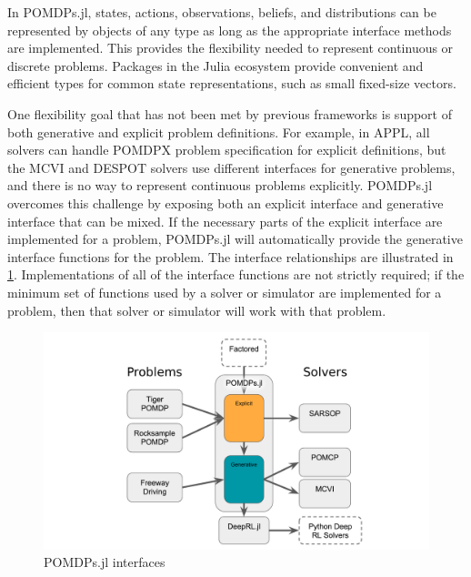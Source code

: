 In POMDPs.jl, states, actions, observations, beliefs, and distributions can be represented by objects of any type as long as the appropriate interface methods are implemented.
This provides the flexibility needed to represent continuous or discrete problems.
Packages in the Julia ecosystem provide convenient and efficient types for common state representations, such as small fixed-size vectors.

One flexibility goal that has not been met by previous frameworks is support of both generative and explicit problem definitions.
For example, in APPL, all solvers can handle POMDPX problem specification for explicit definitions, but the MCVI and DESPOT solvers use different interfaces for generative problems, and there is no way to represent continuous problems explicitly.
POMDPs.jl overcomes this challenge by exposing both an explicit interface and generative interface that can be mixed.
If the necessary parts of the explicit interface are implemented for a problem, POMDPs.jl will automatically provide the generative interface functions for the problem.
The interface relationships are illustrated in \cref{fig:interfaces}.
Implementations of all of the interface functions are not strictly required; if the minimum set of functions used by a solver or simulator are implemented for a problem, then that solver or simulator will work with that problem.

\begin{figure}[htpb]
    \centering
    \includegraphics[width=0.8\linewidth]{media/interfaces.pdf}
    \caption{POMDPs.jl interfaces}
    \label{fig:interfaces}
\end{figure}

